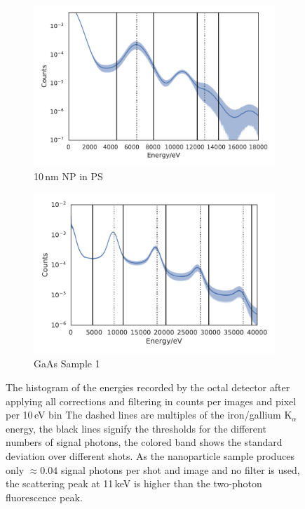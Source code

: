 \begin{figure}
	\centering
	\begin{subfigure}[b]{0.49\textwidth}
		\includegraphics[width=\linewidth]{images/spectrum_nano.pdf}
			\caption {10\,nm NP in PS}
			\label{fig:spectrum_nano}
	\end{subfigure}
	\begin{subfigure}[b]{0.49\textwidth}
		\includegraphics[width=\linewidth]{images/spectrum_gaas1.pdf}
		\caption{GaAs Sample 1}
		\label{fig:spectrum_gaas}
	\end{subfigure}
	\caption[Spectrum on the detector for nanoparticle and  GaAs samples]{The histogram of the energies recorded by the octal detector after applying all corrections and filtering in counts per images and pixel per 10\,eV bin  The dashed lines are multiples of the iron/gallium K$_\alpha$ energy, the black lines signify the thresholds for the different numbers of signal photons, the colored band shows the standard deviation over different shots. As the nanoparticle sample produces only $\approx 0.04$ signal photons per shot and image and no filter is used, the scattering peak at 11\,keV is higher than the two-photon fluorescence peak.}

\end{figure}

